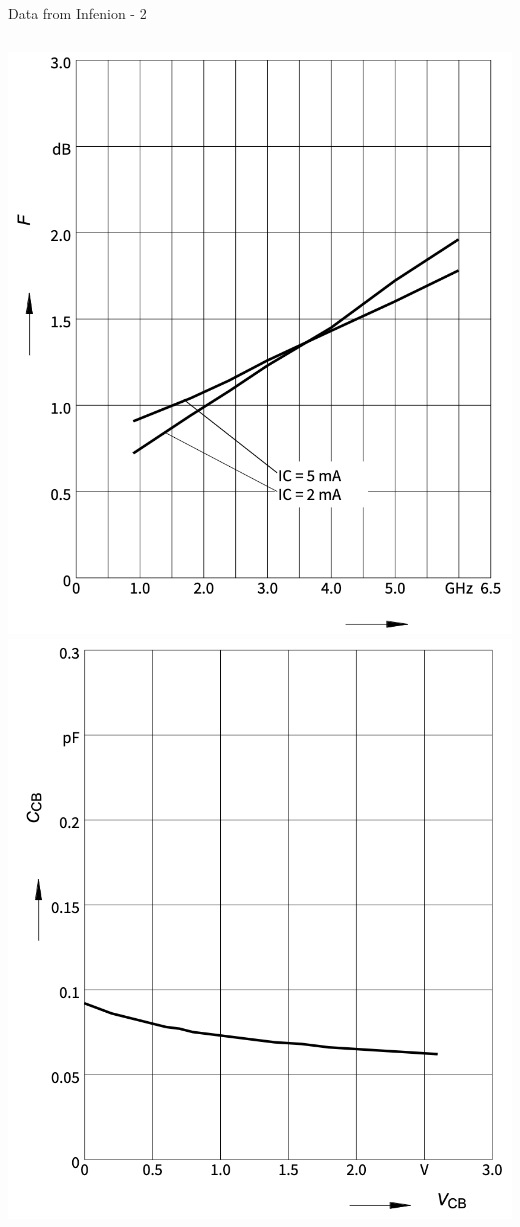 \documentclass{beamer}
\begin{document}
  \begin{frame}{Data from Infenion - 2}
  \begin{columns}
    \includegraphics[width=\linewidth]{images/noise_fig_vs_f.png}
    \includegraphics[width=\linewidth]{images/c_cb_vs_f.png}
  \end{columns}
    
  \end{frame}
\end{document}
